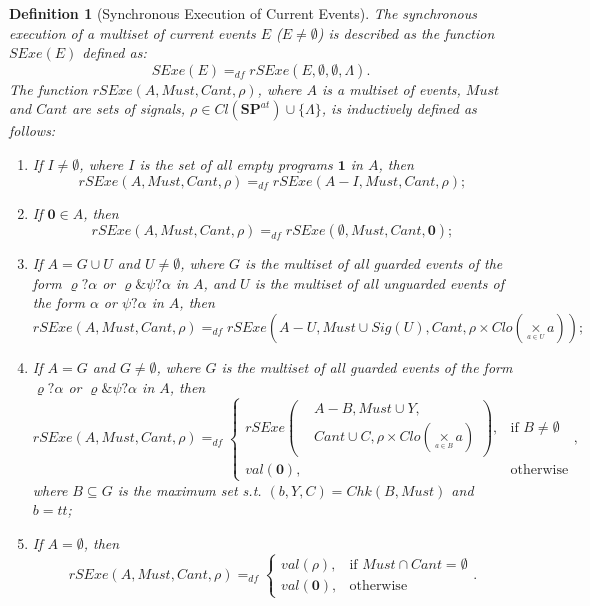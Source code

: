 \documentclass{fcs}
\newtheorem{mydef}{Definition}[section]
\newcommand{\noth}[0]{\mathbf{1}}
\newcommand{\halt}[0]{\mathbf{0}}
\newcommand{\true}[0]{\mathit{tt}}
\newcommand{\SP}[0]{\mathbf{SP}}
\newcommand{\Cl}[0]{\mathit{Cl}}
\newcommand{\val}[0]{\mathit{val}}
\newcommand{\none}[0]{\Lambda}
\newcommand{\SE}[0]{\mathit{SExe}}
\newcommand{\Com}[0]{\mathit{rSExe}}
\newcommand{\Must}[0]{\mathit{Must}}
\newcommand{\Cannot}[0]{\mathit{Cant}}
\newcommand{\ASP}[0]{\SP^{\mathit{at}}}
\newcommand{\Chk}[0]{\mathit{Chk}}
\newcommand{\Closed}[0]{\mathit{Clo}}
\newcommand{\Signal}[0]{\mathit{Sig}}
\newcommand{\dddef}[0]{=_{df}}
\begin{document}
\ifx
\begin{mydef}[Synchronous Execution of Current Events]
	The synchronous execution of a multiset of current events $E$ ($E\neq \emptyset$) is described as the function $\SE(E)$ defined as:
	$$\SE(E)\dddef \Com(E, \emptyset, \emptyset, \none).$$
	The function $\Com(A, \Must, \Cannot, \rho)$, where $A$ is a multiset of events, $\Must$ and $\Cannot$ are sets of signals, $\rho\in \Cl(\ASP)\cup \{\none\}$, is inductively defined as follows:
	
	\begin{enumerate}
		\item If $I\neq \emptyset$, where $I$ is the set of all empty programs $\noth$ in $A$, then
		$$\Com(A,\Must,\Cannot, \rho)\dddef \Com(A - I, \Must, \Cannot, \rho);$$
		
		\item If $\halt\in A$, then
			$$\Com(A,\Must,\Cannot, \rho)\dddef \Com(\emptyset, \Must, \Cannot, \halt);$$
		\item If $A = G \cup U$ and $U\neq \emptyset$, where $G$ is the multiset of all guarded events of the form $\varrho?\alpha$ or $\varrho\& \psi?\alpha$ in $A$, and $U$ is the multiset of all unguarded events of the form $\alpha$ or $\psi?\alpha$ in $A$, then
			$$\Com(A, \Must, \Cannot, \rho)\dddef \Com(A - U, \Must\cup \Signal(U), \Cannot, \rho\times \Closed(\underset{^{a\in U}}{\times}a));$$
			
		\item If $A = G$ and $G\neq \emptyset$, where $G$ is the multiset of all guarded events of the form $\varrho?\alpha$ or $\varrho\& \psi?\alpha$ in $A$,
			then
			$$\Com(A, \Must, \Cannot, \rho)\dddef \left\{\begin{array}{ll}
								\Com\left(\begin{aligned}&A - B, \Must\cup Y, \\
								&\Cannot\cup C,
								\rho\times \Closed(\underset{^{a\in B}}{\times}a)\end{aligned}\right), &\mbox{if $B\neq \emptyset$}\\
								\val(\halt),  &\mbox{otherwise}
								\end{array}
								\right.,$$
			where $B\subseteq G$ is the maximum set s.t. $(b, Y, C) = \Chk(B, \Must)$ and $b = \true$;
		\item If $A = \emptyset$, then
			$$\Com(A, \Must, \Cannot, \rho)\dddef \left\{
			\begin{array}{ll}
			\val(\rho), &\mbox{if $\Must\cap \Cannot = \emptyset$}\\
			\val(\halt),  &\mbox{otherwise}
			\end{array}
			\right..$$
	\end{enumerate}
\end{mydef}
\end{document}
